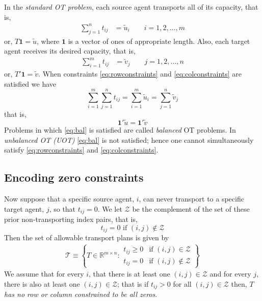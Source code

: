 \documentclass[twocolumn]{article}
\begin{document}
In the {\em standard OT problem}, each source agent transports all of its capacity, that is,
\begin{align}
\label{eq:rowconstraints}
\sum_{j=1}^nt_{ij}  &= \tilde{u}_i  \qquad i=1, 2, \dots, m 
\end{align}
or, $T {\bm 1} = \tilde{u}$, where   ${\bm 1}$ is a vector of ones of appropriate length.
Also,
each target agent receives its desired capacity, that is,
\begin{align}
\label{eq:colconstraints}
\sum_{i=1}^mt_{ij}  &= \tilde{v}_j  \qquad j=1, 2, \dots, n
\end{align}
or, $T' {\bm 1} = \tilde{v}$.
When constraints   \eqref{eq:rowconstraints}  and \eqref{eq:colconstraints} are satisfied we have 
\[
\sum_{i=1}^m\sum_{j=1}^n t_{ij} =\sum_{i=1}^m \tilde{u}_i = \sum_{j=1}^n \tilde{v}_j
\]
that is, 
\begin{equation}
{\bm 1}'\tilde{u} = {\bm 1}'\tilde{v}
\label{eq:bal}
\end{equation}
Problems in which \eqref{eq:bal} is satisfied are called {\em balanced} OT problems.
In {\em  unbalanced OT (UOT)} \eqref{eq:bal}  is not satisfied; hence one cannot  simultaneously satisfy  \eqref{eq:rowconstraints}  and \eqref{eq:colconstraints}.


\subsection{Encoding zero constraints}
Now suppose that a  specific source agent, $i$, can never  transport to a specific target agent, $j$, so that 
 $t_{ij}= 0$.
We let $\mathcal {Z}$ be the complement of the  set of these prior non-transporting  index pairs, that is,
\begin{equation}
\label{eq:U}
t_{ij}= 0  \text{ if } (i ,j) \notin \mathcal {Z} 
\end{equation}
Then the set of allowable transport plans is given by
\begin{align}
\mathcal{T} \equiv \left\{ T \in \mathbb{R}^{m\times n} :  \begin{array}{ll} t_{ij}  \ge 0 & \text{if }  (i,j) \in  \mathcal{Z} \\ 
t_{ij} = 0 & \text{if }   (i,j) \notin  \mathcal{Z} \end{array}  \right\}
\label{eq:Tset}
\end{align}
We assume that for every $i$, that there is at least one $(i, j) \in \mathcal{Z}$
and for every $j$, there is also at least one $(i, j) \in \mathcal{Z}$;
that is  if 
$t_{ij} >0$ for all $(i, j) \in \mathcal{Z}$
then, {\em $T$ has   no row or column constrained to be all zeros}.
\end{document}
